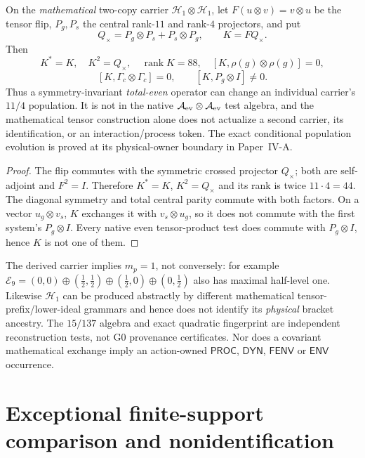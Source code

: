 \documentclass[12pt,a4paper]{article}
\begin{document}
\begin{theorem}
\label{p2b:thm:v264-canonical-paired-exchange}
On the \emph{mathematical} two-copy carrier
$\mathcal H_1\otimes\mathcal H_1$, let $F(u\otimes v)=v\otimes u$
be the tensor flip, $P_g,P_s$ the central rank-$11$ and rank-$4$
projectors, and put
\[
 Q_{\times}=P_g\otimes P_s+P_s\otimes P_g,
 \qquad K=FQ_{\times}.
\]
Then
\[
 K^*=K,\quad K^2=Q_{\times},\quad
 \operatorname{rank}K=88,\quad
 [K,\rho(g)\otimes\rho(g)]=0,
\]
\[
 [K,\Gamma_c\otimes\Gamma_c]=0,
 \qquad [K,P_g\otimes I]\ne0.
\]
Thus a symmetry-invariant \emph{total-even} operator can change an
individual carrier's $11/4$ population. It is not in the native
$\mathcal A_{\rm ev}\otimes\mathcal A_{\rm ev}$ test algebra, and
the mathematical tensor construction alone does not actualize a
second carrier, its identification, or an interaction/process token.
The exact conditional population evolution is proved at its
physical-owner boundary in Paper~IV-A.
\end{theorem}
\begin{proof}
The flip commutes with the symmetric crossed projector $Q_{\times}$;
both are self-adjoint and $F^2=I$. Therefore $K^*=K$,
$K^2=Q_{\times}$ and its rank is twice $11\cdot4=44$.
The diagonal symmetry and total central parity commute with both
factors. On a vector $u_g\otimes v_s$, $K$ exchanges it with
$v_s\otimes u_g$, so it does not commute with the first system's
$P_g\otimes I$. Every native even tensor-product test does commute
with $P_g\otimes I$, hence $K$ is not one of them.
\end{proof}

\begin{remark}
\label{p2b:rem:v264-converse-firewall}
The derived carrier implies $m_p=1$, not conversely: for example
$\mathcal E_9=(0,0)\oplus(\tfrac12,\tfrac12)\oplus
(\tfrac12,0)\oplus(0,\tfrac12)$ also has maximal half-level one.
Likewise $\mathcal H_1$ can be produced abstractly by different
mathematical tensor-prefix/lower-ideal grammars and hence does not
identify its \emph{physical} bracket ancestry. The $15/137$ algebra
and exact quadratic fingerprint are independent reconstruction tests,
not G0 provenance certificates. Nor does a covariant mathematical
exchange imply an action-owned $\mathsf{PROC}$, $\mathsf{DYN}$,
$\mathsf{FENV}$ or $\mathsf{ENV}$ occurrence.
\end{remark}


\section{Exceptional finite-support comparison and nonidentification}
\label{p2b:sec:v318-petersen-momentum-firewall}
\end{document}
